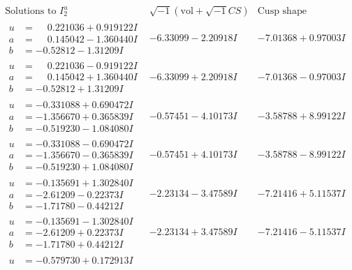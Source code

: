 \documentclass[1p]{elsarticle_modified}
\theoremstyle{definition}
\newcommand{\I}{\sqrt{-1}}
\begin{document}
$$\begin{array}{c|c|c}  
\text{Solutions to }I^u_{2}& \I (\text{vol} + \sqrt{-1}CS) & \text{Cusp shape}\\
 \hline 
\begin{aligned}
u &= \phantom{-}0.221036 + 0.919122 I \\
a &= \phantom{-}0.145042 - 1.360440 I \\
b &= -0.52812 - 1.31209 I\end{aligned}
 & -6.33099 - 2.20918 I & -7.01368 + 0.97003 I \\ \hline\begin{aligned}
u &= \phantom{-}0.221036 - 0.919122 I \\
a &= \phantom{-}0.145042 + 1.360440 I \\
b &= -0.52812 + 1.31209 I\end{aligned}
 & -6.33099 + 2.20918 I & -7.01368 - 0.97003 I \\ \hline\begin{aligned}
u &= -0.331088 + 0.690472 I \\
a &= -1.356670 + 0.365839 I \\
b &= -0.519230 - 1.084080 I\end{aligned}
 & -0.57451 - 4.10173 I & -3.58788 + 8.99122 I \\ \hline\begin{aligned}
u &= -0.331088 - 0.690472 I \\
a &= -1.356670 - 0.365839 I \\
b &= -0.519230 + 1.084080 I\end{aligned}
 & -0.57451 + 4.10173 I & -3.58788 - 8.99122 I \\ \hline\begin{aligned}
u &= -0.135691 + 1.302840 I \\
a &= -2.61209 - 0.22373 I \\
b &= -1.71780 - 0.44212 I\end{aligned}
 & -2.23134 - 3.47589 I & -7.21416 + 5.11537 I \\ \hline\begin{aligned}
u &= -0.135691 - 1.302840 I \\
a &= -2.61209 + 0.22373 I \\
b &= -1.71780 + 0.44212 I\end{aligned}
 & -2.23134 + 3.47589 I & -7.21416 - 5.11537 I \\ \hline\begin{aligned}
u &= -0.579730 + 0.172913 I \\

\end{aligned}
\end{array}$$
\end{document}
